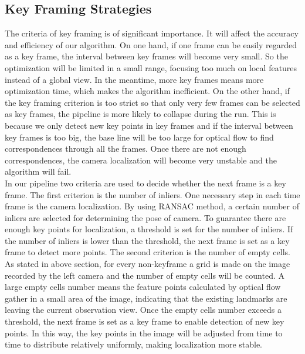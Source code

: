\documentclass{easychair}
\begin{document}
\subsection{Key Framing Strategies}
The criteria of key framing is of significant importance. It will affect the accuracy and efficiency of our algorithm. On one hand, if one frame can be easily regarded as a key frame, the interval between key frames will become very small. So the optimization will be limited in a small range, focusing too much on local features instead of a global view. In the meantime, more key frames means more optimization time, which makes the algorithm inefficient. On the other hand, if the key framing criterion is too strict so that only very few frames can be selected as key frames, the pipeline is more likely to collapse during the run. This is because we only detect new key points in key frames and if the interval between key frames is too big, the base line will be too large for optical flow to find correspondences through all the frames. Once there are not enough correspondences, the camera localization will become very unstable and the algorithm will fail.\\

In our pipeline two criteria are used to decide whether the next frame is a key frame. The first criterion is the number of inliers. One necessary step in each time frame is the camera localization. By using RANSAC method, a certain number of inliers are selected for determining the pose of camera. To guarantee there are enough key points for localization, a threshold is set for the number of inliers. If the number of inliers is lower than the threshold, the next frame is set as a key frame to detect more points. The second criterion is the number of empty cells. As stated in above section, for every non-keyframe a grid is made on the image recorded by the left camera and the number of empty cells will be counted. A large empty cells number means the feature points calculated by optical flow gather in a small area of the image, indicating that the existing landmarks are leaving the current observation view. Once the empty cells number exceeds a threshold, the next frame is set as a key frame to enable detection of new key points. In this way, the key points in the image will be adjusted from time to time to distribute relatively uniformly, making localization more stable.
\end{document}
